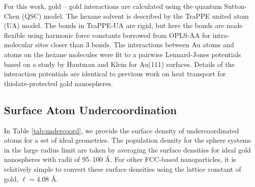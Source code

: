 \documentclass[journal = jpccck, manuscript = suppinfo]{achemso}
\begin{document}
For this work, gold -- gold interactions are calculated using the
quantum Sutton-Chen (QSC) model.\cite{Qi:1999ph} The hexane solvent is
described by the TraPPE united atom (UA)
model.\cite{TraPPE-UA.alkanes} The bonds in TraPPE-UA are rigid, but
here the bonds are made flexible using harmonic force constants
borrowed from OPLS-AA for intra-molecular sites closer than 3
bonds.\cite{Jorgensen98a} The interactions between Au atoms and atoms
on the hexane molecules were fit to a pairwise Lennard-Jones
potentials based on a study by Hautman and Klein for Au(111)
surfaces.\cite{hautman:4994} Details of the interaction potentials are
identical to previous work on heat transport for thiolate-protected
gold nanospheres.\cite{Stocker2016}

\subsection{Surface Atom Undercoordination}
In Table \ref{tab:undercoord}, we provide the surface density of
undercoordinated atoms for a set of ideal geometries. The population
density for the sphere systems in the large radius limit are taken by
averaging the surface densities for ideal gold nanospheres with radii
of 95--100 \AA.  For other FCC-based nanoparticles, it is relatively
simple to convert these surface densities using the lattice constant
of gold, $\ell = 4.08 \text{~\AA}$.
\end{document}
